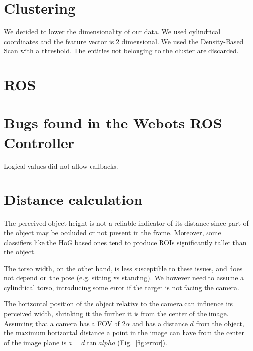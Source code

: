\documentclass[a4paper]{article}
\begin{document}
	\section{Clustering}
	We decided to lower the dimensionality of our data. We used cylindrical coordinates and the feature vector is 2 dimensional.
	We used the Density-Based Scan with a threshold. The entities not belonging to the cluster are discarded.
	
	\section{ROS}
	
	\section{Bugs found in the Webots ROS Controller}
	Logical values did not allow callbacks.
	

	\section{Distance calculation}\label{sec:Distance-calculation}
	The perceived object height is not a reliable indicator of its distance
	since part of the object may be occluded or not present in the frame.
	Moreover, some classifiers like the HoG based ones tend to produce ROIs
	significantly taller than the object.
	
	The torso width, on the other hand, is less susceptible to these issues,
	and does not depend on the pose (e.g. sitting vs standing). We however need
	to assume a cylindrical torso, introducing some error if the target is not
	facing the camera.

	The horizontal position of the object relative to the camera can influence
	its perceived width, shrinking it the further it is from the center of the
	image.  Assuming that a camera has a FOV of $2\alpha$ and has a distance
	$d$ from the object, the maximum horizontal distance a point in the image
	can have from the center of the image plane is $a = d \tan alpha$
	(Fig.~\ref{fig:error}).
\end{document}

